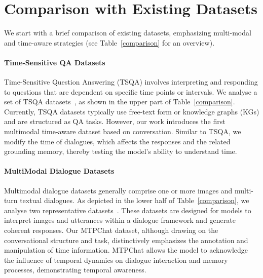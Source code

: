 \section{Comparison with Existing Datasets}
We start with a brief comparison of existing datasets, emphasizing multi-modal and time-aware strategies (see Table~\ref{comparison} for an overview).

\paragraph{Time-Sensitive QA Datasets}

Time-Sensitive Question Answering (TSQA) involves interpreting and responding to questions that are dependent on specific time points or intervals. We analyse a set of TSQA datasets~\cite{dhingra2022time,chen2021dataset,liska2022streamingqa,tan2023towards}, as shown in the upper part of Table~\ref{comparison}. 
Currently, TSQA datasets typically use free-text form or knowledge graphs (KGs) and are structured as QA tasks. However, our work introduces the first multimodal time-aware dataset based on conversation. Similar to TSQA, we modify the time of dialogues, which affects the responses and the related grounding memory, thereby testing the model's ability to understand time.

\paragraph{MultiModal Dialogue Datasets}

Multimodal dialogue datasets generally comprise one or more images and multi-turn textual dialogues. As depicted in the lower half of Table~\ref{comparison}, we analyse two representative datasets~\cite{zang2021photochat,feng2022mmdialog}. These datasets are designed for models to interpret images and utterances within a dialogue framework and generate coherent responses. Our MTPChat dataset, although drawing on the conversational structure and task, distinctively emphasizes the annotation and manipulation of time information. MTPChat allows the model to acknowledge the influence of temporal dynamics on dialogue interaction and memory processes, demonstrating temporal awareness. 

